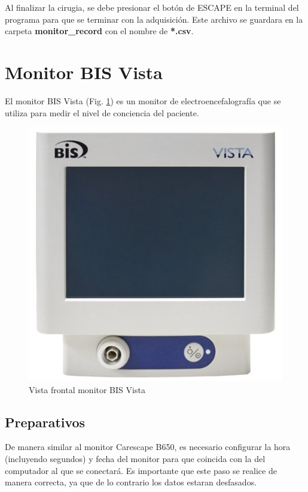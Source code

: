 \documentclass{article}
\begin{document}
Al finalizar la cirugia, se debe presionar el botón de ESCAPE en la terminal del programa para que se terminar con la adquisición. Este archivo se guardara en la carpeta \textbf{monitor\_record} con el nombre de \textbf{*.csv}.



\section{Monitor BIS Vista}

El monitor BIS Vista (Fig. \ref{fig:bis_frontal}) es un monitor de electroencefalografía que se utiliza para medir el nivel de conciencia del paciente. 

\begin{figure}[h]
	\centering
	\includegraphics[scale=0.2]{img/bis_vista.png}
	\caption{Vista frontal monitor BIS Vista}
	\label{fig:bis_frontal}
\end{figure}



\subsection{Preparativos}
De manera similar al monitor Carescape B650, es necesario configurar la hora (incluyendo segundos) y fecha del monitor para que coincida con la del computador al que se conectará. Es importante que este paso se realice de manera correcta, ya que de lo contrario los datos estaran desfasados.
\end{document}
